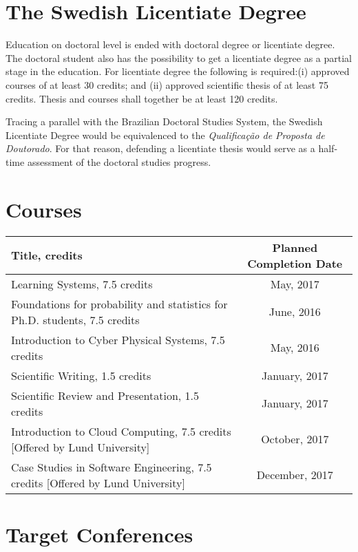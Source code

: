\documentclass[]{report}
\begin{document}
\section*{The Swedish Licentiate Degree}

Education on doctoral level is ended with doctoral degree or licentiate degree. The doctoral student also has the possibility to get a licentiate degree as a partial stage in the education. For licentiate degree the following is required:(i) approved courses of at least 30 credits; and (ii) approved scientific thesis of at least 75 credits. Thesis and courses shall together be at least 120 credits.

Tracing a parallel with the Brazilian Doctoral Studies System, the Swedish Licentiate Degree would be equivalenced to the \textit{Qualifica\c{c}\~{a}o de Proposta de Doutorado}. For that reason, defending a licentiate thesis would serve as a half-time assessment of the doctoral studies progress. 

\section*{Courses}

\begin{center}
	\label{courses}
	\begin{tabular}{|p{7.5cm}|c|} 	 
		\hline	
		\textbf{Title, credits} & \textbf{Planned Completion Date} \\ \hline	
		Learning Systems, 7.5 credits & May, 2017 \\ \hline	
		Foundations for probability and statistics for Ph.D. students, 7.5 credits & June, 2016 \\ \hline	
		Introduction to Cyber Physical Systems, 7.5 credits & May, 2016 \\ \hline	
		Scientific Writing, 1.5 credits & January, 2017 \\ \hline	
		Scientific Review and Presentation, 1.5 credits & January, 2017 \\ \hline
		Introduction to Cloud Computing, 7.5 credits [Offered by Lund University] & October, 2017 \\ \hline	
		Case Studies in Software Engineering, 7.5 credits [Offered by Lund University] & December, 2017 \\ \hline			 		 
	\end{tabular}
\end{center}

\section*{Target Conferences}
\end{document}
